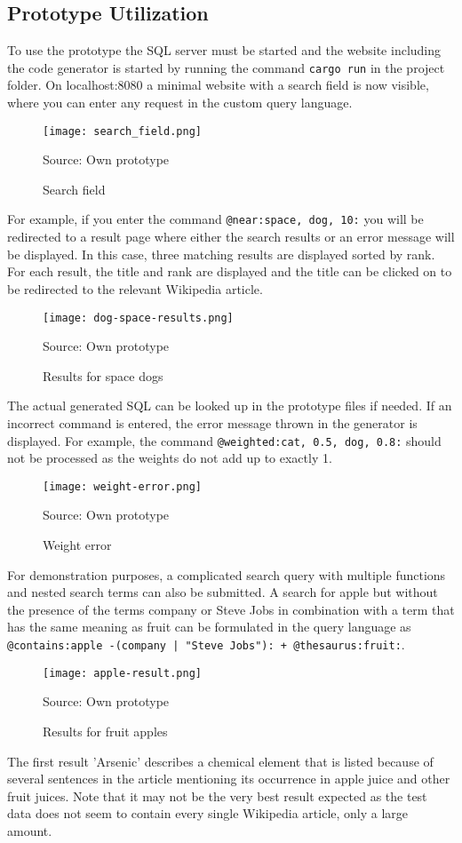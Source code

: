 \subsection{Prototype Utilization}
To use the prototype the \ac{SQL} server must be started and the website including the code generator is started by running the command \lstinline$cargo run$ in the project folder. On localhost:8080 a minimal website with a search field is now visible, where you can enter any request in the custom query language.
\begin{figure}[H]
    \caption{Search field}
    \label{fig:search}
    \texttt{[image: search\_field.png]}
    \\
    \centerline{Source: Own prototype}
\end{figure}
For example, if you enter the command \lstinline[language=Fulltext-Search]$@near:space, dog, 10:$ you will be redirected to a result page where either the search results or an error message will be displayed. In this case, three matching results are displayed sorted by rank. For each result, the title and rank are displayed and the title can be clicked on to be redirected to the relevant Wikipedia article.
\begin{figure}[H]
    \caption{Results for space dogs}
    \label{fig:space-dog}
    \texttt{[image: dog-space-results.png]}
    \\
    \centerline{Source: Own prototype}
\end{figure}
The actual generated \ac{SQL} can be looked up in the prototype files if needed. If an incorrect command is entered, the error message thrown in the generator is displayed. For example, the command \lstinline[language=Fulltext-Search]$@weighted:cat, 0.5, dog, 0.8:$ should not be processed as the weights do not add up to exactly 1.
\begin{figure}[H]
    \caption{Weight error}
    \label{fig:weight-error}
    \texttt{[image: weight-error.png]}
    \\
    \centerline{Source: Own prototype}
\end{figure}
For demonstration purposes, a complicated search query with multiple functions and nested search terms can also be submitted. A search for apple but without the presence of the terms company or Steve Jobs in combination with a term that has the same meaning as fruit can be formulated in the query language as \lstinline[language=Fulltext-Search]$@contains:apple -(company | "Steve Jobs"): + @thesaurus:fruit:$.
\begin{figure}[H]
    \caption{Results for fruit apples}
    \label{fig:apple-fruit}
    \texttt{[image: apple-result.png]}
    \\
    \centerline{Source: Own prototype}
\end{figure}
The first result 'Arsenic' describes a chemical element that is listed because of several sentences in the article mentioning its occurrence in apple juice and other fruit juices. Note that it may not be the very best result expected as the test data does not seem to contain every single Wikipedia article, only a large amount.